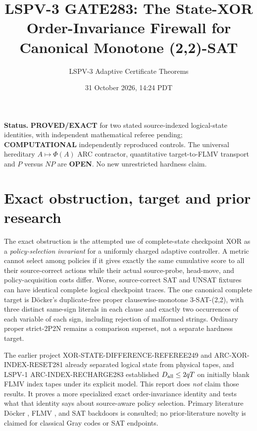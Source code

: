 \documentclass[11pt]{article}
\title{LSPV-3 GATE283: The State-XOR Order-Invariance Firewall for Canonical Monotone (2,2)-SAT}
\author{LSPV-3 Adaptive Certificate Theorems}
\date{31 October 2026, 14:24 PDT}
\begin{document}
\maketitle
\noindent\textbf{Status.} \textbf{PROVED/EXACT} for two stated source-indexed logical-state identities, with independent mathematical referee pending; \textbf{COMPUTATIONAL} independently reproduced controls. The universal hereditary $A\mapsto\Phi(A)$ ARC contractor, quantitative target-to-FLMV transport and $P$ versus $NP$ are \textbf{OPEN}. No new unrestricted hardness claim.

\section{Exact obstruction, target and prior research}
The exact obstruction is the attempted use of complete-state checkpoint XOR as a \emph{policy-selection invariant} for a uniformly charged adaptive controller. A metric cannot select among policies if it gives exactly the same cumulative score to all their source-correct actions while their actual source-probe, head-move, and policy-acquisition costs differ. Worse, source-correct SAT and UNSAT fixtures can have identical complete logical checkpoint traces. The one canonical complete target is D\"ocker's duplicate-free proper clausewise-monotone 3-SAT-(2,2), with three distinct same-sign literals in each clause and exactly two occurrences of each variable of each sign, including rejection of malformed strings. Ordinary proper strict-2P2N remains a comparison superset, not a separate hardness target.

The earlier project XOR-STATE-DIFFERENCE-REFEREE249 and ARC-XOR-INDEX-RESET281 already separated logical state from physical tapes, and LSPV-1 ARC-INDEX-RECHARGE283 established $D_{\rm all}\le2qT$ on initially blank FLMV index tapes under its explicit model. This report does \emph{not} claim those results. It proves a more specialized exact order-invariance identity and tests what that identity says about source-aware policy selection. Primary literature D\"ocker \cite{docker}, FLMV \cite{flmv}, and SAT backdoors \cite{backdoors} is consulted; no prior-literature novelty is claimed for classical Gray codes or SAT endpoints.
\end{document}
